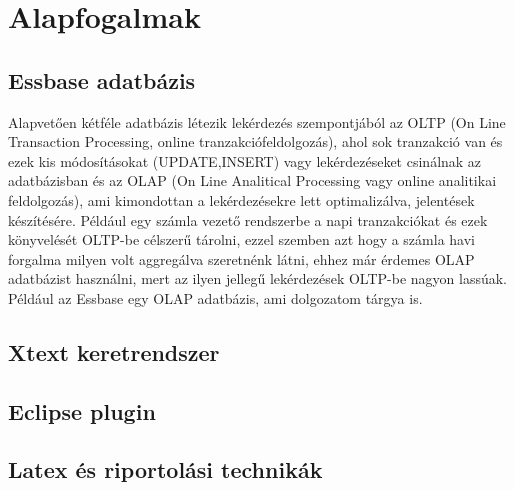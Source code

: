 \chapter{Alapfogalmak}\label{sect:Preliminaries}
\section{Essbase adatbázis}
Alapvetően kétféle adatbázis létezik lekérdezés szempontjából az OLTP (On Line
Transaction Processing, online tranzakciófeldolgozás), ahol sok tranzakció van és ezek kis
módosításokat (UPDATE,INSERT) vagy lekérdezéseket csinálnak az
adatbázisban és az OLAP (On Line Analitical Processing vagy online
analitikai feldolgozás), ami kimondottan a lekérdezésekre lett optimalizálva,
jelentések készítésére. Például egy számla vezető rendszerbe a napi
tranzakciókat és ezek könyvelését OLTP-be célszerű tárolni, ezzel szemben azt
hogy a számla havi forgalma milyen volt aggregálva szeretnénk látni, ehhez már
érdemes OLAP adatbázist használni, mert az ilyen jellegű lekérdezések OLTP-be
nagyon lassúak. Például az Essbase egy OLAP adatbázis, ami dolgozatom tárgya
is.

\section{Xtext keretrendszer}

\section{Eclipse plugin}

\section{Latex és riportolási technikák}